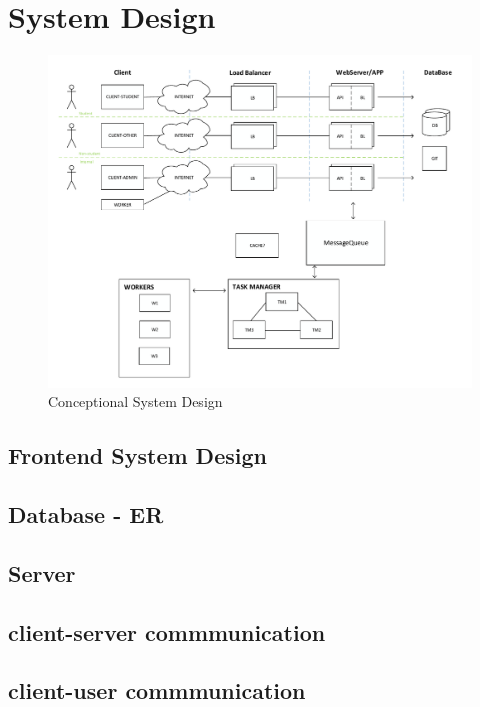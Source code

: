 \section{System Design}

\begin{figure}[!ht]
	\includegraphics[width=\textwidth]{figures/atfogo_rendszerterv.pdf}
	\caption{Conceptional System Design}
	\label{fig:conceptional-system-design}
\end{figure}


\subsection{Frontend System Design}

\subsection{Database - ER}

\subsection{Server}

\subsection{client-server commmunication}

\subsection{client-user commmunication}